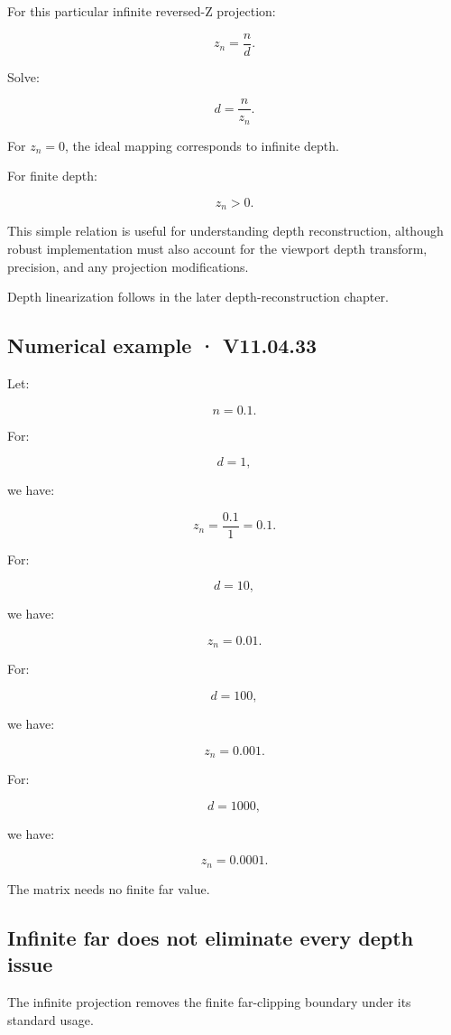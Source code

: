 For this particular infinite reversed-Z projection:

\[
 z_n=\frac nd.
\]

Solve:

\[
 \boxed{ d=\frac n{z_n} }.
\]

For \(z_n=0\), the ideal mapping corresponds to infinite depth.

For finite depth:

\[
 z_n>0.
\]

This simple relation is useful for understanding depth reconstruction, although robust implementation must also account for the viewport depth transform, precision, and any projection modifications.

Depth linearization follows in the later depth-reconstruction chapter.

\subsection{Numerical example · V11.04.33}\label{02-foundations-ii-ch033-numerical-example-v11.04.33}

Let:

\[
 n=0.1.
\]

For:

\[
 d=1,
\]

we have:

\[
 z_n=\frac{0.1}{1}=0.1.
\]

For:

\[
 d=10,
\]

we have:

\[
 z_n=0.01.
\]

For:

\[
 d=100,
\]

we have:

\[
 z_n=0.001.
\]

For:

\[
 d=1000,
\]

we have:

\[
 z_n=0.0001.
\]

The matrix needs no finite far value.

\subsection{Infinite far does not eliminate every depth issue}\label{02-foundations-ii-ch033-infinite-far-does-not-eliminate-every-depth-issue}

The infinite projection removes the finite far-clipping boundary under its standard usage.

